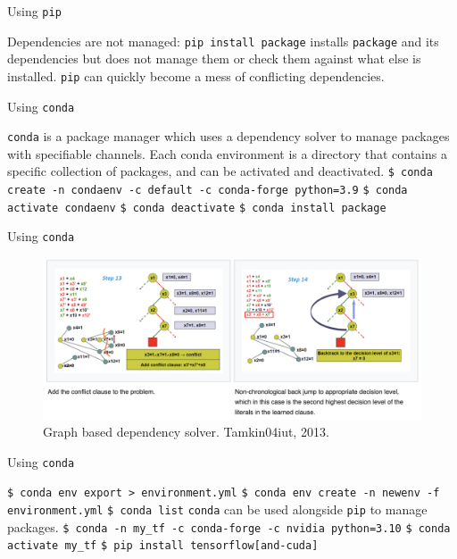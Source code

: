 \documentclass[aspectratio=169]{beamer}
\begin{document}
    \begin{frame}{Using \texttt{pip}}
        \begin{outline}
            \1 Dependencies are not managed: 
            \2 \texttt{pip install package} installs \texttt{package} and its dependencies
            \2 but does not manage them
            \2 or check them against what else is installed.
            \1 \texttt{pip} can quickly become a mess of conflicting dependencies.
        \end{outline}
    \end{frame}

    \begin{frame}{Using \texttt{conda}}
        \begin{outline}
            \1 \texttt{conda} is a package manager which uses a dependency solver to manage packages with specifiable channels.
            \1 Each conda environment is a directory that contains a specific collection of packages, and can be activated and deactivated.
            \2 \texttt{\$ conda create -n condaenv -c default -c conda-forge python=3.9} 
            \2 \texttt{\$ conda activate condaenv} 
            \2 \texttt{\$ conda deactivate}
            \2 \texttt{\$ conda install package}
        \end{outline}
    \end{frame}

    \begin{frame}{Using \texttt{conda}}
        \begin{figure}[H]
            \centering
            \includegraphics[width=0.75\linewidth]{conda.png}
            \caption{Graph based dependency solver. \ccLogo Tamkin04iut, 2013.}
        \end{figure}
    \end{frame}

    \begin{frame}{Using \texttt{conda}}
        \begin{outline}
            \1 \texttt{\$ conda env export > environment.yml} 
            \1 \texttt{\$ conda env create -n newenv -f environment.yml}   \1 \texttt{\$ conda list} 
            \1 \texttt{conda} can be used alongside \texttt{pip} to manage packages.
                \2 \texttt{\$ conda -n my\_tf -c conda-forge -c nvidia python=3.10} 
                \2 \texttt{\$ conda activate my\_tf}
                \2 \texttt{\$ pip install tensorflow[and-cuda]} 
        \end{outline}
    \end{frame}
\end{document}
